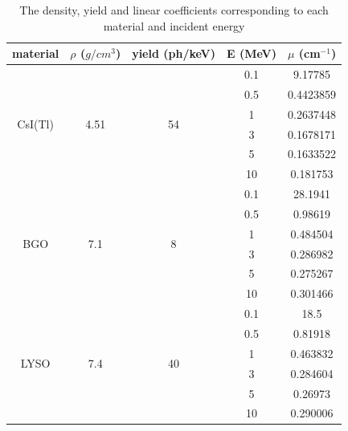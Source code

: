 \documentclass{article}
\begin{document}
\begin{table}[H]
    \centering
    \begin{tabular}{|ccccc|}
    \hline
        material &   $\rho$ ($g/cm^3$)&yield (ph/keV)&E (MeV) & $\mu$ (cm$^{-1}$) \\ \hline
        \multirow{6}{*}{CsI(Tl)} &   \multirow{6}{*}{4.51}&\multirow{6}{*}{54}&0.1 & 9.17785 \\ 
         &   &&0.5 & 0.4423859 \\ 
         &   &&1 & 0.2637448 \\ 
         &   &&3 & 0.1678171 \\ 
         &   &&5 & 0.1633522 \\ 
         &   &&10 & 0.181753 \\ \hline
       \multirow{6}{*}{BGO} &   \multirow{6}{*}{7.1}&\multirow{6}{*}{8}&0.1 & 28.1941 \\ 
         &   &&0.5 & 0.98619 \\ 
         &   &&1 & 0.484504 \\ 
         &   &&3 & 0.286982 \\ 
         &   &&5 & 0.275267 \\ 
         &   &&10 & 0.301466 \\ \hline
        \multirow{6}{*}{LYSO} &   \multirow{6}{*}{7.4}&\multirow{6}{*}{40}&0.1 & 18.5 \\ 
         &   &&0.5 & 0.81918 \\ 
         &   &&1 & 0.463832 \\ 
         &   &&3 & 0.284604 \\ 
         &   &&5 & 0.26973 \\ 
         &   &&10 & 0.290006 \\ \hline
    \end{tabular}
    \caption{The density, yield and linear coefficients corresponding to each material and incident energy}
\end{table}
\end{document}
